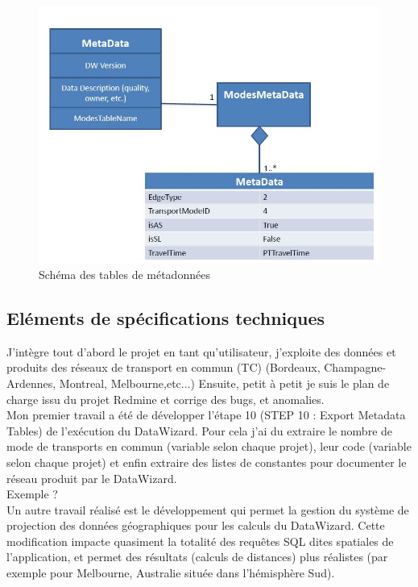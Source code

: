 \begin{itemize}
\begin{figure}[!h]
\centering
\includegraphics[width=14cm]{images/DW_specMetadata.JPG}
\caption{\label{DW_Metadata}Schéma des tables de métadonnées}
\end{figure} 

\subsection{Eléments de spécifications techniques}

J'intègre tout d'abord le projet en tant qu'utilisateur, j'exploite des données et produits des réseaux de transport en commun (TC) (Bordeaux, Champagne-Ardennes, Montreal, Melbourne,etc...) Ensuite, petit à petit je suis le plan de charge issu du projet Redmine et corrige des bugs, et anomalies.\\

Mon premier travail a été de développer l'étape 10 (STEP 10 : Export Metadata Tables) de l'exécution du DataWizard. Pour cela j'ai du extraire le nombre de mode de transports en commun (variable selon chaque projet), leur code (variable selon chaque projet) et enfin extraire des listes de constantes pour documenter le réseau produit par le DataWizard.\\

Exemple ?\\

Un autre travail réalisé est le développement qui permet la gestion du système de projection des données géographiques pour les calculs du DataWizard. Cette modification impacte quasiment la totalité des requêtes SQL dites spatiales de l'application, et permet des résultats (calculs de distances) plus réalistes (par exemple pour Melbourne, Australie située dans l'hémisphère Sud).\\



\end{itemize}
